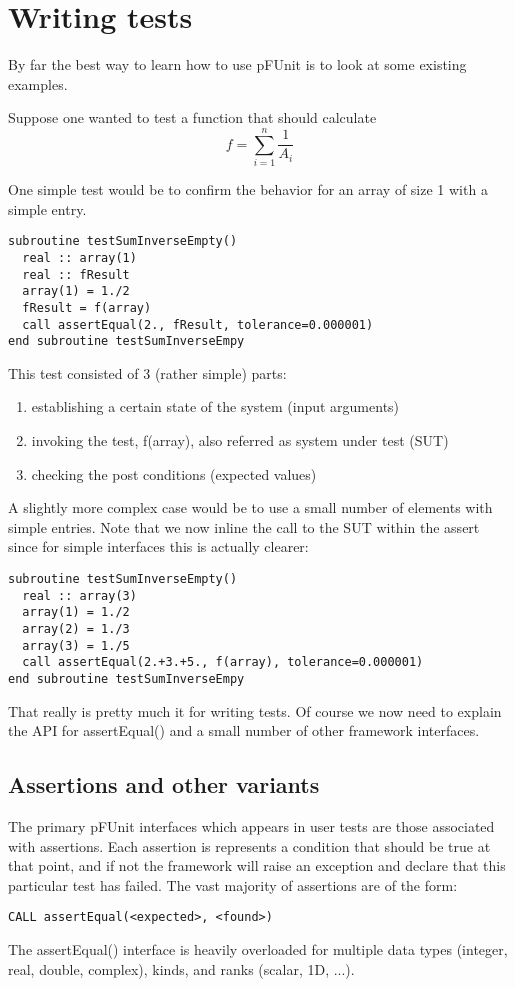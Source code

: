\documentclass[10pt]{article}
\newcommand{\pfunit}{{\sc pFUnit }}
\begin{document}
\section{Writing tests}

By far the best way to learn how to use \pfunit is to look at some
existing examples.

Suppose one wanted to test a function that should calculate
\[
f = \sum_{i=1}^{n} \frac{1}{A_i}
\]

One simple test would be to confirm the behavior for an array of size
1 with a simple entry.
\begin{verbatim}
subroutine testSumInverseEmpty()
  real :: array(1)
  real :: fResult
  array(1) = 1./2
  fResult = f(array)
  call assertEqual(2., fResult, tolerance=0.000001)
end subroutine testSumInverseEmpy
\end{verbatim}

This test consisted of 3 (rather simple) parts:
\begin{enumerate}
\item establishing a certain state of the system (input arguments)
\item invoking the test, f(array), also referred as system under test (SUT)
\item checking the post conditions (expected values)
\end{enumerate}

A slightly more complex case would be to use a small number of
elements with simple entries.  Note that we now inline the call to the
SUT within the assert since for simple interfaces this is actually
clearer:

\begin{verbatim}
subroutine testSumInverseEmpty()
  real :: array(3)
  array(1) = 1./2
  array(2) = 1./3
  array(3) = 1./5
  call assertEqual(2.+3.+5., f(array), tolerance=0.000001)
end subroutine testSumInverseEmpy
\end{verbatim}


That really is pretty much it for writing tests.  Of course we now
need to explain the API for assertEqual() and a small number of other
framework interfaces.


\subsection{Assertions and other variants}

The primary \pfunit interfaces which appears in user tests are those
associated with assertions.  Each assertion is represents a condition
that should be true at that point, and if not the framework will raise
an exception and declare that this particular test has failed.  The
vast majority of assertions are of the form:
\begin{verbatim}
CALL assertEqual(<expected>, <found>)
\end{verbatim}
The assertEqual() interface is heavily overloaded for multiple data
types (integer, real, double, complex), kinds, and ranks (scalar, 1D,
...).
\end{document}

